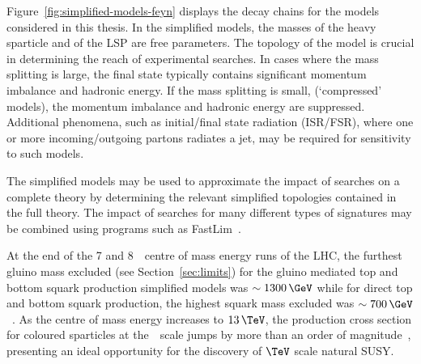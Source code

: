 Figure~\ref{fig:simplified-models-feyn} displays the decay chains for the models considered in this thesis. 
In the simplified models, the masses of the heavy sparticle and of the LSP are free parameters.
The topology of the model is crucial in determining the reach of experimental searches. 
In cases where the mass splitting is large, the final state typically contains significant
momentum imbalance and hadronic energy. If the mass splitting is small, (`compressed' models),
the momentum imbalance and hadronic energy are suppressed. Additional phenomena, such as initial/final state radiation (ISR/FSR), 
where one or more incoming/outgoing partons radiates a jet, may be required for sensitivity to such models.

The simplified models may be used to approximate the impact of searches on a complete theory 
by determining the relevant simplified topologies contained in the full theory. The impact
of searches for many different types of signatures may be combined using programs 
such as FastLim~\cite{Fastlim}.

At the end of the 7 and 8~\TeV~centre of mass energy runs of the LHC, the furthest
gluino mass excluded (see Section~\ref{sec:limits}) for the gluino mediated top and bottom 
squark production simplified models was $\sim 1300\,\GeV$ while for direct top and 
bottom squark production, the highest squark mass excluded was $\sim 700\,\GeV$~\cite{limits8}. 
As the centre of mass energy increases to $13\,\TeV$, the production cross section for coloured sparticles
at the~\TeV~scale jumps by more than an order of magnitude~\cite{snowmass}, presenting
an ideal opportunity for the discovery of $\TeV$ scale natural SUSY.




